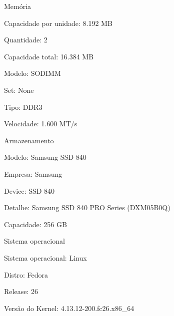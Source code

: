 \begin{anexosenv}
\begin{alineas}
        \item Memória

        \begin{alineas}

            \item Capacidade por unidade: 8.192 MB

            \item Quantidade: 2

            \item Capacidade total: 16.384 MB

            \item Modelo: SODIMM

            \item Set: None

            \item Tipo: DDR3

            \item Velocidade: 1.600 MT/s

        \end{alineas}

        \item Armazenamento

        \begin{alineas}

            \item Modelo: Samsung SSD 840

            \item Empresa: Samsung

            \item Device: SSD 840

            \item Detalhe: Samsung SSD 840 PRO Series (DXM05B0Q)

            \item Capacidade: 256 GB

        \end{alineas}

        \item Sistema operacional

        \begin{alineas}

            \item Sistema operacional: Linux

            \item Distro: Fedora

            \item Release: 26

            \item Versão do Kernel: 4.13.12-200.fc26.x86\_64

        \end{alineas}

        \end{alineas}



\end{anexosenv}
